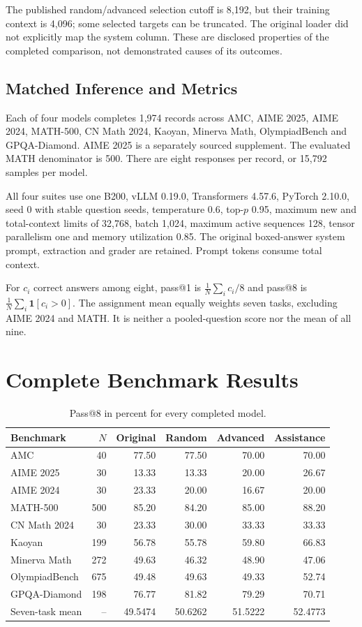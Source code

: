 \documentclass[10pt,letterpaper]{article}
\begin{document}
The published random/advanced selection cutoff is 8,192, but their training context is 4,096; some selected targets can be truncated. The original loader did not explicitly map the system column. These are disclosed properties of the completed comparison, not demonstrated causes of its outcomes.



\subsection{Matched Inference and Metrics}
Each of four models completes 1,974 records across AMC, AIME 2025, AIME 2024, MATH-500, CN Math 2024, Kaoyan, Minerva Math, OlympiadBench and GPQA-Diamond. AIME 2025 is a separately sourced supplement. The evaluated MATH denominator is 500. There are eight responses per record, or 15,792 samples per model.

All four suites use one B200, vLLM 0.19.0, Transformers 4.57.6, PyTorch 2.10.0, seed 0 with stable question seeds, temperature 0.6, top-$p$ 0.95, maximum new and total-context limits of 32,768, batch 1,024, maximum active sequences 128, tensor parallelism one and memory utilization 0.85. The original boxed-answer system prompt, extraction and grader are retained. Prompt tokens consume total context.

For $c_i$ correct answers among eight, pass@1 is $\frac{1}{N}\sum_i c_i/8$ and pass@8 is $\frac{1}{N}\sum_i\mathbf{1}[c_i>0]$. The assignment mean equally weights seven tasks, excluding AIME 2024 and MATH. It is neither a pooled-question score nor the mean of all nine.

\newpage
\section{Complete Benchmark Results}
\begin{table}[H]\centering\scriptsize
\caption{Pass@8 in percent for every completed model.}
\begin{tabular}{lrrrrr}\toprule
Benchmark & $N$ & Original & Random & Advanced & Assistance\\\midrule
AMC & 40 & 77.50 & 77.50 & 70.00 & 70.00 \\
AIME 2025 & 30 & 13.33 & 13.33 & 20.00 & 26.67 \\
AIME 2024 & 30 & 23.33 & 20.00 & 16.67 & 20.00 \\
MATH-500 & 500 & 85.20 & 84.20 & 85.00 & 88.20 \\
CN Math 2024 & 30 & 23.33 & 30.00 & 33.33 & 33.33 \\
Kaoyan & 199 & 56.78 & 55.78 & 59.80 & 66.83 \\
Minerva Math & 272 & 49.63 & 46.32 & 48.90 & 47.06 \\
OlympiadBench & 675 & 49.48 & 49.63 & 49.33 & 52.74 \\
GPQA-Diamond & 198 & 76.77 & 81.82 & 79.29 & 70.71 \\
\midrule
Seven-task mean & -- & 49.5474 & 50.6262 & 51.5222 & 52.4773 \\\bottomrule
\end{tabular}
\end{table}
\end{document}
